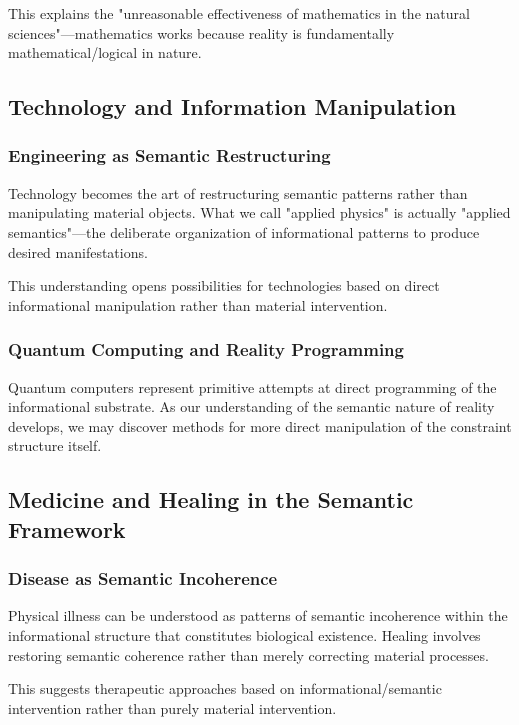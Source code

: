 \documentclass[12pt,a4paper]{article}
\begin{document}
This explains the "unreasonable effectiveness of mathematics in the natural sciences"—mathematics works because reality is fundamentally mathematical/logical in nature.

\subsection{Technology and Information Manipulation}

\subsubsection{Engineering as Semantic Restructuring}

Technology becomes the art of restructuring semantic patterns rather than manipulating material objects. What we call "applied physics" is actually "applied semantics"—the deliberate organization of informational patterns to produce desired manifestations.

This understanding opens possibilities for technologies based on direct informational manipulation rather than material intervention.

\subsubsection{Quantum Computing and Reality Programming}

Quantum computers represent primitive attempts at direct programming of the informational substrate. As our understanding of the semantic nature of reality develops, we may discover methods for more direct manipulation of the constraint structure itself.

\subsection{Medicine and Healing in the Semantic Framework}

\subsubsection{Disease as Semantic Incoherence}

Physical illness can be understood as patterns of semantic incoherence within the informational structure that constitutes biological existence. Healing involves restoring semantic coherence rather than merely correcting material processes.

This suggests therapeutic approaches based on informational/semantic intervention rather than purely material intervention.
\end{document}
